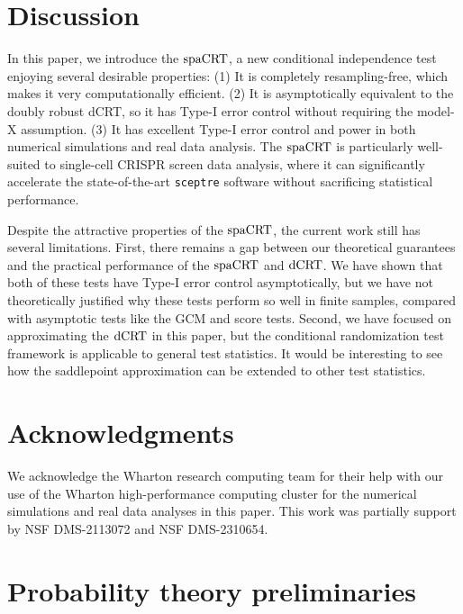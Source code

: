 \documentclass[12pt]{article}
\theoremstyle{definition}
\newcommand{\dCRT}{\textnormal{dCRT}} 					%
\newcommand{\spacrt}{\textnormal{spaCRT}}               %
\begin{document}


\section{Discussion} \label{sec:discussion}

In this paper, we introduce the $\spacrt$, a new conditional independence test enjoying several desirable properties: (1) It is completely resampling-free, which makes it very computationally efficient. (2) It is asymptotically equivalent to the doubly robust dCRT, so it has Type-I error control without requiring the model-X assumption. (3) It has excellent Type-I error control and power in both numerical simulations and real data analysis. The $\spacrt$ is particularly well-suited to single-cell CRISPR screen data analysis, where it can significantly accelerate the state-of-the-art \verb|sceptre| software without sacrificing statistical performance.

Despite the attractive properties of the $\spacrt$, the current work still has several limitations. First, there remains a gap between our theoretical guarantees and the practical performance of the $\spacrt$ and $\dCRT$. We have shown that both of these tests have Type-I error control asymptotically, but we have not theoretically justified why these tests perform so well in finite samples, compared with asymptotic tests like the GCM and score tests. Second, we have focused on approximating the $\dCRT$ in this paper, but the conditional randomization test framework is applicable to general test statistics. It would be interesting to see how the saddlepoint approximation can be extended to other test statistics.

\section{Acknowledgments}

We acknowledge the Wharton research computing team for their help with our use of the Wharton high-performance computing cluster for the numerical simulations and real data analyses in this paper. This work was partially support by NSF DMS-2113072 and NSF DMS-2310654.


\clearpage 

\printbibliography

\clearpage

\appendix

\section{Probability theory preliminaries}
\end{document}
